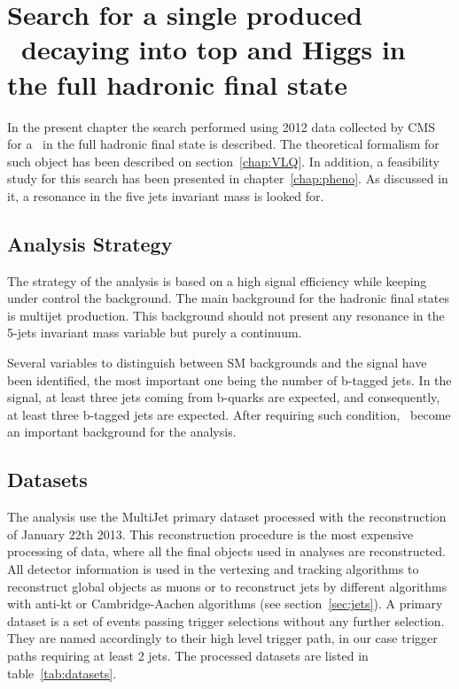 \chapter[Single VLQ search]{Search for a single produced \Tp~decaying into top and Higgs in the full hadronic final state}
\label{chap:search}

In the present chapter the search performed using 2012 data collected by CMS for a \Tp~in the full hadronic final state is described. The theoretical formalism for such object has been described on section~\ref{chap:VLQ}. In addition, a feasibility study for this search has been presented in chapter~\ref{chap:pheno}. As discussed in it, a resonance in the five jets invariant mass is looked for.

\section{Analysis Strategy}
\label{sec:stra}

The strategy of the analysis is based on a high signal efficiency while keeping under control the background. The main background for the hadronic final states is multijet production. This background should not present any resonance in the 5-jets invariant mass variable but purely a continuum. %

Several variables to distinguish between SM backgrounds and the signal have been identified, the most important one being the number of b-tagged jets. In the signal, at least three jets coming from b-quarks are expected, and consequently, at least three b-tagged jets are expected. After requiring such condition, \ttbar~become an important background for the analysis. %

\section{Datasets}
\label{sec:data}

The analysis use the MultiJet primary dataset processed with the reconstruction of January 22th 2013. This reconstruction procedure is the most expensive processing of data, where all the final objects used in analyses are reconstructed. All detector information is used in the vertexing and tracking algorithms to reconstruct global objects as muons or to reconstruct jets by different algorithms with anti-kt or Cambridge-Aachen algorithms (see section~\ref{sec:jets}). A primary dataset is a set of events passing trigger selections without any further selection. They are named accordingly to their high level trigger path, in our case trigger paths requiring at least 2 jets. The processed datasets are listed in table~\ref{tab:datasets}.

